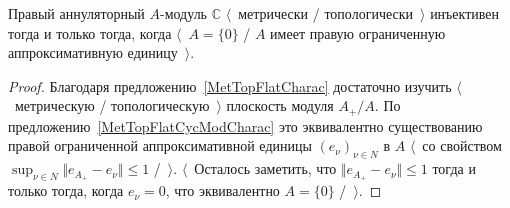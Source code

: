\begin{proposition}\label{MetTopInjModCCharac} Правый аннуляторный $A$-модуль
$\mathbb{C}$ $\langle$~метрически / топологически~$\rangle$ инъективен тогда и
только тогда, когда $\langle$~$A= \{0 \}$ / $A$  имеет правую ограниченную
аппроксимативную единицу~$\rangle$.
\end{proposition}
\begin{proof} Благодаря предложению~\ref{MetTopFlatCharac} достаточно изучить
$\langle$~метрическую / топологическую~$\rangle$ плоскость модуля $A_+/A$. По
предложению~\ref{MetTopFlatCycModCharac} это эквивалентно существованию правой
ограниченной аппроксимативной единицы ${(e_\nu)}_{\nu\in N}$ в $A$ $\langle$~со
свойством $\sup_{\nu\in N}\Vert e_{A_+}-e_\nu\Vert\leq 1$ /~$\rangle$.
$\langle$~Осталось заметить, что $\Vert e_{A_+}-e_\nu\Vert\leq 1$ тогда и только
тогда, когда $e_\nu=0$, что эквивалентно $A= \{0 \}$ /~$\rangle$.
\end{proof}

